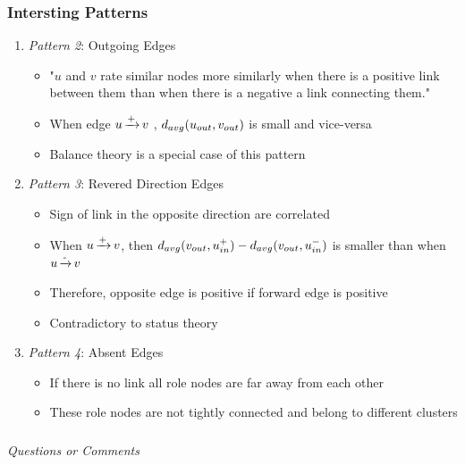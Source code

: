 \documentclass{beamer}
\begin{document}
\begin{frame}
    \frametitle{Intersting Patterns}
    \begin{enumerate}
        \item \textit{Pattern 2}: Outgoing Edges
        \begin{itemize}
            \item "$u$ and $v$ rate similar nodes more similarly when there is a positive link
            between them than when there is a negative a link connecting them."
            \item When edge $u \operatorname*{\xrightarrow{+}} v$ , $d_{avg}(u_{out},v_{out})$ is small and vice-versa
            \item Balance theory is a special case of this pattern
        \end{itemize}
        \item \textit{Pattern 3}: Revered Direction Edges 
        \begin{itemize}
            \item Sign of link in the opposite direction are correlated
            \item When $u \operatorname*{\xrightarrow{+}} v$, then $d_{avg}(v_{out},u_{in}^{+})-d_{avg}(v_{out},u_{in}^{-})$ is smaller than when $u \operatorname*{\xrightarrow{-}} v$
            \item Therefore, opposite edge is positive if forward edge is positive
            \item Contradictory to status theory
        \end{itemize}
        \item \textit{Pattern 4}: Absent Edges
        \begin{itemize}
            \item If there is no link all role nodes are far away from each other
            \item These role nodes are not tightly connected and belong to different clusters
        \end{itemize}
    \end{enumerate}
    \hyperlink{slide:results}{}

\end{frame}

\begin{frame}
    \frametitle{}

    \centering \Large
    \emph{Questions or Comments}

\end{frame}



\end{document}
